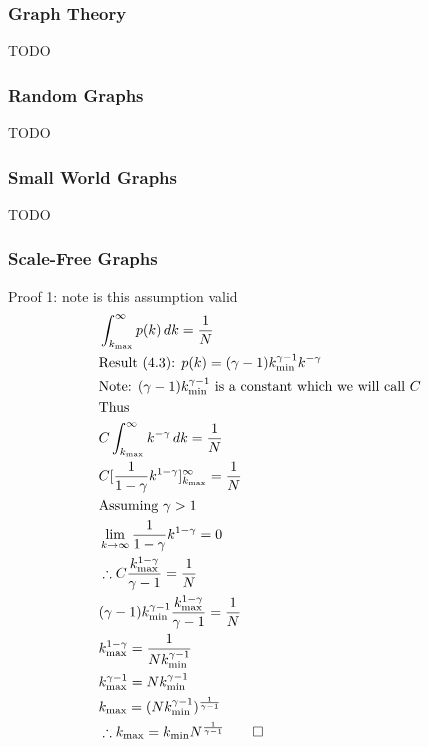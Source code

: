 \documentclass{article}
\begin{document}
            \subsubsection{Graph Theory}
            TODO
            \subsubsection{Random Graphs}
            TODO
            \subsubsection{Small World Graphs}
            TODO
            \subsubsection{Scale-Free Graphs}
            Proof 1: note is this assumption valid
            \begin{align*}
                &\int_{k_{\text{max}}}^{\infty} p(k) \,dk = \frac{1}{N}\\
                &\text{Result (4.3): } p(k) = (\gamma -1)k^{\gamma-1}_{\text{min}}k^{-\gamma}\\
                &\text{Note: $(\gamma -1)k^{\gamma-1}_{\text{min}}$ is a constant which we will call $C$}\\
                &\text{Thus}\\
                &C\int_{k_{\text{max}}}^{\infty}k^{-\gamma} \,dk  = \frac{1}{N}\\
                &C[\frac{1}{1-\gamma}k^{1-\gamma}]^{\infty}_{k_{\text{max}}} = \frac{1}{N}\\
                &\text{Assuming $\gamma>1$}\\
                &\lim_{k \to \infty} \frac{1}{1-\gamma}k^{1-\gamma}= 0\\
                &\therefore C\frac{{k^{1-\gamma}_{\text{max}}}}{\gamma -1} = \frac{1}{N}\\
                &(\gamma-1)k^{\gamma-1}_{\text{min}}\frac{{k^{1-\gamma}_{\text{max}}}}{\gamma -1} = \frac{1}{N}\\
                &k^{1-\gamma}_{\text{max}} = \frac{1}{Nk^{\gamma-1}_{\text{min}}}\\
                &k^{\gamma -1}_{\text{max}} = Nk^{\gamma-1}_{\text{min}}\\
                &k_{\text{max}} = (Nk^{\gamma-1}_{\text{min}})^{\frac{1}{\gamma-1}}\\
                &\therefore k_{\text{max}} = k_{\text{min}}N^{\frac{1}{\gamma-1}} \qed
            \end{align*}
\end{document}
